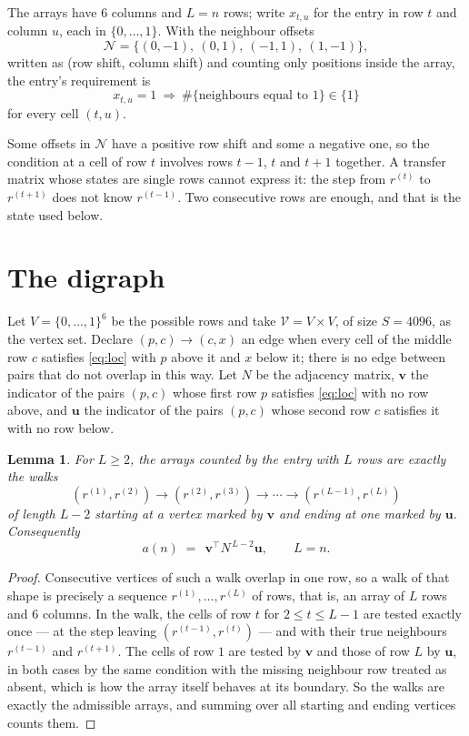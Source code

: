 \documentclass[11pt,a4paper]{article}
\theoremstyle{plain}
\newtheorem{lemma}[theorem]{Lemma}
\theoremstyle{definition}
\begin{document}
The arrays have $6$ columns and $L=n$ rows; write $x_{t,u}$ for the entry in
row $t$ and column $u$, each in $\{0,\dots,1\}$. With the neighbour offsets
\[
\mathcal N=\{(0,-1),\ (0,1),\ (-1,1),\ (1,-1)\},
\]
written as (row shift, column shift) and counting only positions inside the array, the
entry's requirement is
\begin{equation}\label{eq:loc}
x_{t,u}=1\ \Rightarrow\ \#\{\text{neighbours equal to }1\}\in\{1\}
\end{equation}
for every cell $(t,u)$.

Some offsets in $\mathcal N$ have a positive row shift and some a negative one, so the
condition at a cell of row $t$ involves rows $t-1$, $t$ and $t+1$ together. A transfer
matrix whose states are single rows cannot express it: the step from $r^{(t)}$ to
$r^{(t+1)}$ does not know $r^{(t-1)}$. Two consecutive rows are enough, and that is
the state used below.

\section{The digraph}

Let $V=\{0,\dots,1\}^{6}$ be the possible rows and take
$\mathcal V=V\times V$, of size $S=4096$, as the vertex set. Declare $(p,c)\to(c,x)$ an edge
when every cell of the middle row $c$ satisfies \eqref{eq:loc} with $p$ above it and $x$
below it; there is no edge between pairs that do not overlap in this way. Let $N$ be the
adjacency matrix, $\mathbf{v}$ the indicator of the pairs $(p,c)$ whose first row $p$
satisfies \eqref{eq:loc} with no row above, and $\mathbf{u}$ the indicator of
the pairs $(p,c)$ whose second row $c$ satisfies it with no row below.

\begin{lemma}\label{lem:walk}
For $L\ge2$, the arrays counted by the entry with $L$ rows are exactly the walks
\[
(r^{(1)},r^{(2)})\to(r^{(2)},r^{(3)})\to\cdots\to(r^{(L-1)},r^{(L)})
\]
of length $L-2$ starting at a vertex marked by $\mathbf{v}$ and ending at one marked by
$\mathbf{u}$. Consequently
\[
a(n)\;=\;\,\mathbf{v}^{\!\top}N^{\,L-2}\mathbf{u},\qquad L=n .
\]
\end{lemma}

\begin{proof}
Consecutive vertices of such a walk overlap in one row, so a walk of that shape is
precisely a sequence $r^{(1)},\dots,r^{(L)}$ of rows, that is, an array of $L$ rows
and $6$ columns. In the walk, the cells of row $t$ for $2\le t\le L-1$ are tested
exactly once --- at the step leaving $(r^{(t-1)},r^{(t)})$ --- and with their true
neighbours $r^{(t-1)}$ and $r^{(t+1)}$. The cells of row $1$ are tested by
$\mathbf{v}$ and those of row $L$ by $\mathbf{u}$, in both cases by the same condition
with the missing neighbour row treated as absent, which is how the array itself behaves at
its boundary. So the walks are exactly the admissible arrays, and summing over all starting
and ending vertices counts them.
\end{proof}
\end{document}
